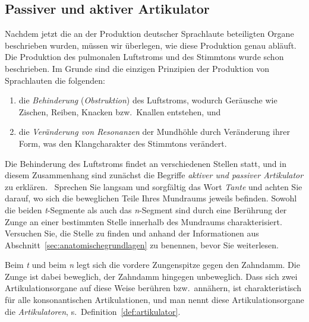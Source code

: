 \subsection{Passiver und aktiver Artikulator}
\label{sec:passiverundaktiverartikulator}

Nachdem jetzt die an der Produktion deutscher Sprachlaute beteiligten Organe beschrieben wurden, müssen wir überlegen, wie diese Produktion genau abläuft.
Die Produktion des pulmonalen Luftstroms und des Stimmtons wurde schon beschrieben.
Im Grunde sind die einzigen Prinzipien der Produktion von Sprachlauten die folgenden:

\begin{enumerate}
  \item die \textit{Behinderung} (\textit{Obstruktion}) des Luftstroms, wodurch Geräusche wie Zischen, Reiben, Knacken bzw.\ Knallen entstehen, und
  \item die \textit{Veränderung von Resonanzen} der Mundhöhle durch Veränderung ihrer Form, was den Klangcharakter des Stimmtons verändert.
\end{enumerate}

Die Behinderung des Luftstroms findet an verschiedenen Stellen statt, und in diesem Zusammenhang sind zunächst die Begriffe \textit{aktiver und passiver Artikulator} zu erklären.
\TuBegin~Sprechen Sie langsam und sorgfältig das Wort \textit{Tante} und achten Sie darauf, wo sich die beweglichen Teile Ihres Mundraums jeweils befinden.
Sowohl die beiden \textit{t}-Segmente als auch das \textit{n}-Segment sind durch eine Berührung der Zunge an einer bestimmten Stelle innerhalb des Mundraums charakterisiert.
Versuchen Sie, die Stelle zu finden und anhand der Informationen aus Abschnitt~\ref{sec:anatomischegrundlagen} zu benennen, bevor Sie weiterlesen.

Beim \textit{t} und beim \textit{n} legt sich die vordere Zungenspitze gegen den Zahndamm.
Die Zunge ist dabei beweglich, der Zahndamm hingegen unbeweglich.
Dass sich zwei Artikulationsorgane auf diese Weise berühren bzw.\ annähern, ist charakteristisch für alle konsonantischen Artikulationen, und man nennt diese Artikulationsorgane die \textit{Artikulatoren}, s.\ Definition~\ref{def:artikulator}.


